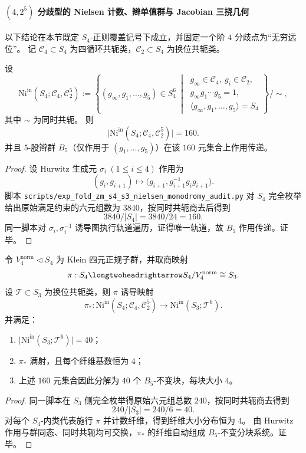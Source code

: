\paragraph{\texorpdfstring{$(4,2^5)$}{(4,2^5)} 分歧型的 Nielsen 计数、辫单值群与 Jacobian 三挠几何}
以下结论在本节既定 \(S_4\)-正则覆盖记号下成立，并固定一个阶 \(4\) 分歧点为“无穷远位”。
记 \(\mathcal C_4\subset S_4\) 为四循环共轭类，\(\mathcal C_2\subset S_4\) 为换位共轭类。

\begin{conclusion}\label{con:xi-terminal-zm-s4-nielsen-in-160-b5-transitive}
设
\[
\mathrm{Ni}^{\mathrm{in}}(S_4;\mathcal C_4,\mathcal C_2^5)
:=\left\{
(g_\infty,g_1,\ldots,g_5)\in S_4^6\ \middle|\
\begin{array}{l}
g_\infty\in \mathcal C_4,\ g_i\in\mathcal C_2,\\
g_\infty g_1\cdots g_5=1,\\
\langle g_\infty,g_1,\ldots,g_5\rangle=S_4
\end{array}
\right\}\Big/\!\sim,
\]
其中 \(\sim\) 为同时共轭。
则
\[
\bigl|\mathrm{Ni}^{\mathrm{in}}(S_4;\mathcal C_4,\mathcal C_2^5)\bigr|=160.
\]
并且 \(5\)-股辫群 \(B_5\)（仅作用于 \((g_1,\ldots,g_5)\)）在该 \(160\) 元集合上作用传递。
\end{conclusion}
\begin{proof}
设 Hurwitz 生成元 \(\sigma_i\ (1\le i\le 4)\) 作用为
\[
(g_i,g_{i+1})\longmapsto \bigl(g_{i+1},g_{i+1}^{-1}g_i g_{i+1}\bigr).
\]
脚本
\texttt{scripts/exp\_fold\_zm\_s4\_s3\_nielsen\_monodromy\_audit.py}
对 \(S_4\) 完全枚举给出原始满足约束的六元组数为 \(3840\)，按同时共轭商去后得到
\[
3840/|S_4|=3840/24=160.
\]
同一脚本对 \(\sigma_i,\sigma_i^{-1}\) 诱导图执行轨道遍历，证得唯一轨道，故 \(B_5\) 作用传递。证毕。
\end{proof}

\begin{conclusion}\label{con:xi-terminal-zm-s4-to-s3-nielsen-40-blocks-of-4}
令 \(V_4^{\mathrm{norm}}\triangleleft S_4\) 为 Klein 四元正规子群，并取商映射
\[
\pi:S_4\longtwoheadrightarrow S_4/V_4^{\mathrm{norm}}\cong S_3.
\]
设 \(\mathcal T\subset S_3\) 为换位共轭类，则 \(\pi\) 诱导映射
\[
\pi_*:\mathrm{Ni}^{\mathrm{in}}(S_4;\mathcal C_4,\mathcal C_2^5)\longrightarrow
\mathrm{Ni}^{\mathrm{in}}(S_3;\mathcal T^6).
\]
并满足：
\begin{enumerate}
  \item \(\bigl|\mathrm{Ni}^{\mathrm{in}}(S_3;\mathcal T^6)\bigr|=40\)；
  \item \(\pi_*\) 满射，且每个纤维基数恒为 \(4\)；
  \item 上述 \(160\) 元集合因此分解为 \(40\) 个 \(B_5\)-不变块，每块大小 \(4\)。
\end{enumerate}
\end{conclusion}
\begin{proof}
同一脚本在 \(S_3\) 侧完全枚举得原始六元组总数 \(240\)，按同时共轭商去得到
\[
240/|S_3|=240/6=40.
\]
对每个 \(S_4\)-内类代表施行 \(\pi\) 并计数纤维，得到纤维大小分布恒为 \(4\)。
由 Hurwitz 作用与群同态、同时共轭均可交换，\(\pi_*\) 的纤维自动组成 \(B_5\)-不变分块系统。证毕。
\end{proof}

